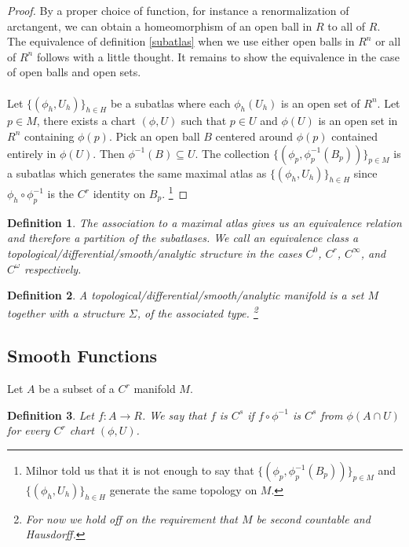 \documentclass{article}
\theoremstyle{problemstyle}
\theoremstyle{problemstyle}
\theoremstyle{problemstyle}
\newtheorem{definition}{Definition}
\theoremstyle{problemstyle}
\theoremstyle{problemstyle}
\begin{document}
\begin{proof}
By a proper choice of function, for instance a renormalization of arctangent, we can obtain a homeomorphism of an open ball in $R$ to all of $R$. The equivalence of definition \ref{subatlas} when we use either open balls in $R^n$ or all of $R^n$ follows with a little thought. It remains to show the equivalence in the case of open balls and open sets.\\\\ 
Let $\{(\phi_h,U_h)\}_{h \in H}$ be a subatlas where each $\phi_h(U_h)$ is an open set of $R^n$. Let $p \in M$, there exists a chart $(\phi,U)$ such that $p \in U$ and $\phi(U)$ is an open set in $R^n$ containing $\phi(p)$. Pick an open ball $B$ centered around $\phi(p)$ contained entirely in $\phi(U)$. Then $\phi^{-1}(B) \subseteq U$. The collection $\{(\phi_p,\phi_p^{-1}(B_p))\}_{p \in M}$ is a subatlas which generates the same maximal atlas as $\{(\phi_h,U_h)\}_{h \in H}$ since $\phi_h\circ \phi_p^{-1}$ is the $C^r$ identity on $B_p$. \footnote{Milnor told us that it is not enough to say that $\{(\phi_p,\phi_p^{-1}(B_p))\}_{p \in M}$ and $\{(\phi_h,U_h)\}_{h \in H}$ generate the same topology on $M$.}
\end{proof}

\begin{definition}
The association to a maximal atlas gives us an equivalence relation and therefore a partition of the subatlases. We call an equivalence class a topological/differential/smooth/analytic structure in the cases $C^0$, $C^r$, $C^\infty$, and $C^\omega$ respectively.  
\end{definition}

\begin{definition}
A topological/differential/smooth/analytic manifold is a set $M$ together with a structure $\Sigma$, of the associated type. \footnote{For now we hold off on the requirement that $M$ be second countable and Hausdorff.}
\end{definition}

\subsection{Smooth Functions}

Let $A$ be a subset of a $C^r$ manifold $M$.

\begin{definition}
Let $f:A\rightarrow R$. We say that $f$ is $C^s$ if $f \circ \phi^{-1}$ is $C^s$ from $\phi(A \cap U)$ for every $C^r$ chart $(\phi, U)$. 
\end{definition}
\end{document}

